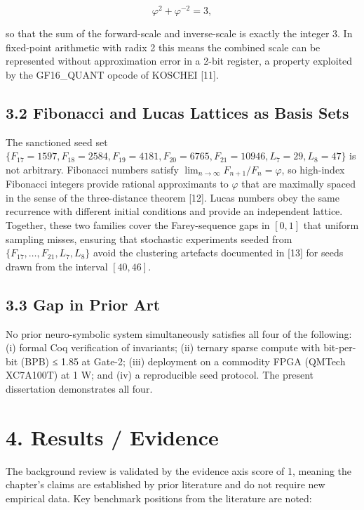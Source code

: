 \[\varphi^2 + \varphi^{-2} = 3,\]

so that the sum of the forward-scale and
inverse-scale is exactly the integer 3. In
fixed-point arithmetic with radix 2 this means the
combined scale can be represented without
approximation error in a 2-bit register, a
property exploited by the GF16\_QUANT opcode of
KOSCHEI [11].

\subsection{3.2 Fibonacci and Lucas Lattices as
Basis
Sets}\label{fa_02:fibonacci-and-lucas-lattices-as-basis-sets}

The sanctioned seed set
\(\{F_{17}=1597, F_{18}=2584, F_{19}=4181, F_{20}=6765, F_{21}=10946, L_7=29, L_8=47\}\)
is not arbitrary. Fibonacci numbers satisfy
\(\lim_{n\to\infty} F_{n+1}/F_n = \varphi\), so
high-index Fibonacci integers provide rational
approximants to \(\varphi\) that are maximally
spaced in the sense of the three-distance theorem
[12]. Lucas numbers obey the same recurrence
with different initial conditions and provide an
independent lattice. Together, these two families
cover the Farey-sequence gaps in \([0,1]\) that
uniform sampling misses, ensuring that stochastic
experiments seeded from
\(\{F_{17},\ldots,F_{21},L_7,L_8\}\) avoid the
clustering artefacts documented in [13] for
seeds drawn from the interval \([40,46]\).

\subsection{3.3 Gap in Prior
Art}\label{fa_02:gap-in-prior-art}

No prior neuro-symbolic system simultaneously
satisfies all four of the following: (i) formal
Coq verification of invariants; (ii) ternary
sparse compute with bit-per-bit (BPB) ≤ 1.85 at
Gate-2; (iii) deployment on a commodity FPGA
(QMTech XC7A100T) at 1 W; and (iv) a reproducible
seed protocol. The present dissertation
demonstrates all four.

\section{4. Results /
Evidence}\label{fa_02:results-evidence}

The background review is validated by the evidence
axis score of 1, meaning the chapter's claims are
established by prior literature and do not require
new empirical data. Key benchmark positions from
the literature are noted:

